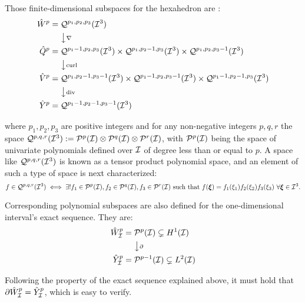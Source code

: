 Those finite-dimensional subspaces for the hexahedron are \cite{Nedelec80}:
% 
\begin{align*}
    \hat{W}^p&=\mathcal{Q}^{p_1,p_2,p_3}(\mathcal{I}^3)\\
    \ &\ \ \ \ \big\downarrow  \scriptstyle{\nabla}\\
    \hat{Q}^p&=\mathcal{Q}^{p_1-1,p_2,p_3}(\mathcal{I}^3)\times\mathcal{Q}^{p_1,p_2-1,p_3}(\mathcal{I}^3)\times\mathcal{Q}^{p_1,p_2,p_3-1}(\mathcal{I}^3)\\
    \ &\ \ \ \ \big\downarrow  \scriptstyle{\operatorname{curl}}\\
    \hat{V}^p&=\mathcal{Q}^{p_1,p_2-1,p_3-1}(\mathcal{I}^3)\times\mathcal{Q}^{p_1-1,p_2,p_3-1}(\mathcal{I}^3)\times\mathcal{Q}^{p_1-1,p_2-1,p_3}(\mathcal{I}^3)\\
    \ &\ \ \ \ \big\downarrow  \scriptstyle{\operatorname{div}}\\
    \hat{Y}^p&=\mathcal{Q}^{p_1-1,p_2-1,p_3-1}(\mathcal{I}^3)
\end{align*}

\noindent where $p_1,p_2,p_3$ are positive integers and for any non-negative integers $p,q,r$ the space $\mathcal{Q}^{p,q,r}(\mathcal{I}^3):=\mathcal{P}^p(\mathcal{I})\otimes\mathcal{P}^q(\mathcal{I})\otimes\mathcal{P}^r(\mathcal{I})$, with $\mathcal{P}^p(\mathcal{I})$ being the space of univariate polynomials defined over $\mathcal{I}$ of degree less than or equal to $p$. A space like $\mathcal{Q}^{p,q,r}(\mathcal{I}^3)$ is known as a tensor product polynomial space, and an element of such a type of space is next characterized:
% 
\begin{equation}
    f\in\mcQ^{p,q,r}(\mcI^3)\iff\exists ! f_1\in\mcP^p(\mcI),f_2\in\mcP^q(\mcI),f_3\in\mcP^r(\mcI)\text{ such that }
    f(\bsxi)=f_1(\xi_1)f_2(\xi_2)f_3(\xi_3)\ \forall\bsxi\in\mcI^3.
\end{equation}

Corresponding polynomial subspaces are also defined for the one-dimensional interval's exact sequence. They are:
% 
\begin{align*}
    \hat{W}^{p}_{\mathcal{I}}&=\mathcal{P}^p(\mathcal{I})\subsetneq H^1(\mathcal{I})\\
    \ &\ \ \ \ \big\downarrow  \scriptstyle{\partial}\\
    \hat{Y}^{p}_{\mathcal{I}}&=\mathcal{P}^{p-1}(\mathcal{I})\subsetneq L^2(\mathcal{I})
\end{align*}

Following the property of the exact sequence explained above, it must hold that $\partial\hat{W}^{p}_{\mathcal{I}}=\hat{Y}^{p}_{\mathcal{I}}$, which is easy to verify.

